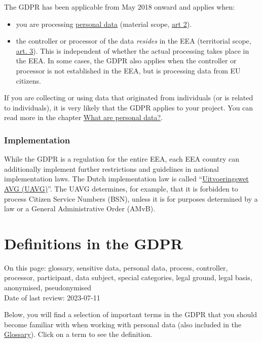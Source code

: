 \documentclass[
]{book}
\providecommand{\tightlist}{%
  \setlength{\itemsep}{0pt}\setlength{\parskip}{0pt}}
\begin{document}
The GDPR has been applicable from May 2018 onward and applies when:

\begin{itemize}
\tightlist
\item
  you are processing \protect\hyperlink{personal-data}{personal data}
  (material scope, \href{https://gdpr-info.eu/art-2-gdpr/}{art 2}).
\item
  the controller or processor of the data \emph{resides} in the EEA (territorial
  scope, \href{https://gdpr-info.eu/art-3-gdpr/}{art. 3}).
  This is independent of whether the actual processing takes place in the EEA.
  In some cases, the GDPR also applies when the controller or processor is not
  established in the EEA, but is processing data from EU citizens.
\end{itemize}

If you are collecting or using data that originated from individuals (or is
related to individuals), it is very likely that the GDPR applies to your project.
You can read more in the chapter \protect\hyperlink{personal-data}{What are personal data?}.

\hypertarget{implementation}{%
\subsubsection{Implementation}\label{implementation}}

While the GDPR is a regulation for the entire EEA, each EEA country can additionally
implement further restrictions and guidelines in national implementation laws. The
Dutch implementation law is called
``\href{https://wetten.overheid.nl/BWBR0040940/2021-07-01\%22}{Uitvoeringswet AVG (UAVG)}''.
The UAVG determines, for example, that it is forbidden to process Citizen
Service Numbers (BSN), unless it is for purposes determined by a law or a
General Administrative Order (AMvB).

\hypertarget{definitions}{%
\section{Definitions in the GDPR}\label{definitions}}

On this page: glossary, sensitive data, personal data, process, controller,
processor, participant, data subject, special categories, legal ground, legal
basis, anonymised, pseudonymised\\
Date of last review: 2023-07-11

Below, you will find a selection of important terms in the GDPR that you should
become familiar with when working with personal data (also included in the
\protect\hyperlink{glossary}{Glossary}). Click on a term to see the definition.
\end{document}
